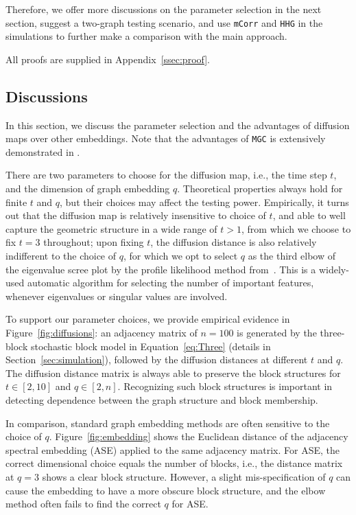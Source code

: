 \documentclass[11pt]{article}
\theoremstyle{definition}
\begin{document}
Therefore, we offer more discussions on the parameter selection in the next section, suggest a two-graph testing scenario, and use \texttt{mCorr} and \texttt{HHG} in the simulations to further make a comparison with the main approach.

All proofs are supplied in Appendix~\ref{ssec:proof}.

\subsection{Discussions}
\label{ss:dis}
 
In this section, we discuss the parameter selection and the advantages of diffusion maps over other embeddings. Note that the advantages of \texttt{MGC} is extensively demonstrated in \cite{shen2016discovering}.

There are two parameters to choose for the diffusion map, i.e., the time step $t$, and the dimension of graph embedding $q$. Theoretical properties always hold for finite $t$ and $q$, but their choices may affect the testing power. Empirically, it turns out that the diffusion map is relatively insensitive to choice of $t$, and able to well capture the geometric structure in a wide range of $t>1$, from which we choose to fix $t=3$ throughout; upon fixing $t$, the diffusion distance is also relatively indifferent to the choice of $q$, for which we opt to select $q$ as the third elbow of the eigenvalue scree plot by the profile likelihood method from~\cite{ZhuGhodsi2006}. This is a widely-used automatic algorithm for selecting the number of important features, whenever eigenvalues or singular values are involved. 

To support our parameter choices, we provide empirical evidence in Figure~\ref{fig:diffusions}: an adjacency matrix of $n=100$ is generated by the three-block stochastic block model in Equation~\ref{eq:Three} (details in Section~\ref{sec:simulation}), followed by the diffusion distances at different $t$ and $q$. The diffusion distance matrix is always able to preserve the block structures for $t \in [2,10]$ and $q \in [2,n]$. Recognizing such block structures is important in detecting dependence between the graph structure and block membership.

In comparison, standard graph embedding methods are often sensitive to the choice of $q$. Figure~\ref{fig:embedding} shows the Euclidean distance of the adjacency spectral embedding (ASE) \cite{SussmanEtAl2012} applied to the same adjacency matrix. For ASE, the correct dimensional choice equals the number of blocks, i.e., the distance matrix at $q=3$ shows a clear block structure. However, a slight mis-specification of $q$ can cause the embedding to have a more obscure block structure, and the elbow method often fails to find the correct $q$ for ASE.
\end{document}
